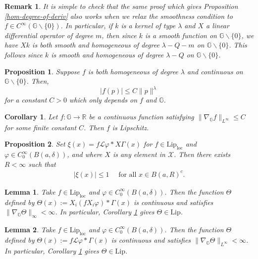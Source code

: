 \documentclass[10pt,a4paper]{amsart}
\newtheorem{prop}{Proposition}
\newtheorem{rem}{Remark}
\newtheorem{cor}{Corollary}
\newtheorem{lem}{Lemma}
\newcommand{\G}{\mathbb{G}}
\renewcommand{\L}{\mathcal{L}}
\newcommand{\cg}{\Gamma}
\renewcommand{\l}{\lambda}
\begin{document}
\begin{rem}\label{deriv-of-fund-soln}
It is simple to check that the same proof which gives Proposition \ref{hom-degree-of-deriv} also works when we relax the smoothness condition to $f \in C^{\infty}(\G \backslash \{0\})$. In particular, if $k$ is a kernel of type $\l$ and $X$ a linear differential operator of degree $m$, then since $k$ is a smooth function on $\G \backslash \{0\}$, we have $X k$ is both smooth and homogeneous of degree $\l - Q - m$ on $\G \backslash \{0\}$. This follows since $k$ is smooth and homogeneous of degree $\l - Q$ on $\G \backslash \{0\}$.
\end{rem}

\begin{prop}\label{hom-func-bound}
Suppose $f$ is both homogeneous of degree $\l$ and continuous on $\G \backslash \{0\}$. Then, $$|f(p)| \leq C \| p\|^{\l}$$ for a constant $C>0$ which only depends on $f$ and $\G$. 
\end{prop}

\begin{cor}\label{bounded-deriv-is-lip}
Let $f : \G \rightarrow \mathbb{R}$ be a continuous function satisfying $\| \nabla_{\G} f\|_{L^{\infty}} \leq C$ for some finite constant $C$. Then $f$ is Lipschitz.  
\end{cor}

\begin{prop}\label{decay-of-one-deriv}
 Set $\xi(x) = f \L \varphi \ast X\cg(x)$ for $f \in \text{Lip}_{\text{loc}}$ and $\varphi \in C_0^{\infty}(B(a,\delta))$, and where $X$ is any element in $\mathcal{X}$. Then there exists $R < \infty$ such that \begin{align*}
     |\xi(x)|\leq 1 \quad \text{ for all }x\in B(a,R)^c.
 \end{align*}  
\end{prop}

\begin{lem}\label{second_func_in_lip}
Take $f\in \text{Lip}_{\text{loc}}$ and $\varphi \in C_0^{\infty}(B(a,\delta))$. Then the function $\Theta$ defined by $\Theta(x) := X_i(f X_i \varphi) \ast \cg(x)$ is continuous and satisfies $\| \nabla_{\G} \Theta \|_{\infty} < \infty$. In particular, Corollary \ref{bounded-deriv-is-lip} gives $\Theta \in \text{Lip}$.  
\end{lem}

\begin{lem}\label{third_func_in_lip}
Take $f \in \text{Lip}_{\text{loc}}$ and $\varphi \in C_0^{\infty}(B(a,\delta))$. Then the function $\Theta$ defined by $\Theta (x) := f\L \varphi \ast \cg(x)$ is continuous and satisfies $\| \nabla_{\G} \Theta \|_{L^{\infty}} < \infty$. In particular, Corollary \ref{bounded-deriv-is-lip} gives $\Theta \in \text{Lip}$.  
\end{lem}
\end{document}

